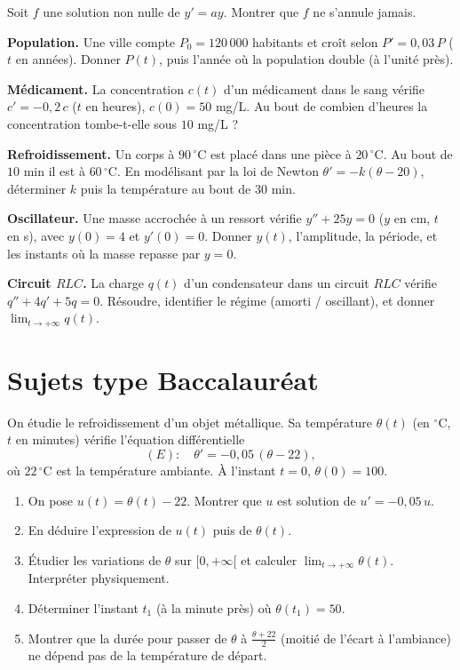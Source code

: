 \exo{} Soit $f$ une solution non nulle de $y'=ay$. Montrer que $f$ ne
s'annule jamais.


\exo{} \textbf{Population.} Une ville compte $P_0=120\,000$ habitants et
croît selon $P'=0{,}03\,P$ ($t$ en années). Donner $P(t)$, puis l'année où la
population double (à l'unité près).

\exo{} \textbf{Médicament.} La concentration $c(t)$ d'un médicament dans
le sang vérifie $c'=-0{,}2\,c$ ($t$ en heures), $c(0)=50$ mg/L. Au bout de combien
d'heures la concentration tombe-t-elle sous $10$ mg/L ?

\exo{} \textbf{Refroidissement.} Un corps à $90\,^\circ$C est placé dans
une pièce à $20\,^\circ$C. Au bout de $10$ min il est à $60\,^\circ$C. En
modélisant par la loi de Newton $\theta'=-k(\theta-20)$, déterminer $k$ puis la
température au bout de $30$ min.

\exo{} \textbf{Oscillateur.} Une masse accrochée à un ressort vérifie
$y''+25y=0$ ($y$ en cm, $t$ en s), avec $y(0)=4$ et $y'(0)=0$. Donner $y(t)$,
l'amplitude, la période, et les instants où la masse repasse par $y=0$.

\exo{} \textbf{Circuit $RLC$.} La charge $q(t)$ d'un condensateur dans un
circuit $RLC$ vérifie $q''+4q'+5q=0$. Résoudre, identifier le régime (amorti /
oscillant), et donner $\lim_{t\to+\infty}q(t)$.

\section{Sujets type Baccalauréat}

On étudie le refroidissement d'un objet métallique. Sa température $\theta(t)$
(en $^\circ$C, $t$ en minutes) vérifie l'équation différentielle
\[
(E):\quad \theta'=-0{,}05\,(\theta-22),
\]
où $22\,^\circ$C est la température ambiante. À l'instant $t=0$, $\theta(0)=100$.
\begin{enumerate}[label=\arabic*)]
\item On pose $u(t)=\theta(t)-22$. Montrer que $u$ est solution de $u'=-0{,}05\,u$.
\item En déduire l'expression de $u(t)$ puis de $\theta(t)$.
\item Étudier les variations de $\theta$ sur $[0,+\infty[$ et calculer
$\displaystyle\lim_{t\to+\infty}\theta(t)$. Interpréter physiquement.
\item Déterminer l'instant $t_1$ (à la minute près) où $\theta(t_1)=50$.
\item Montrer que la durée pour passer de $\theta$ à $\frac{\theta+22}{2}$ (moitié
de l'écart à l'ambiance) ne dépend pas de la température de départ.
\end{enumerate}

